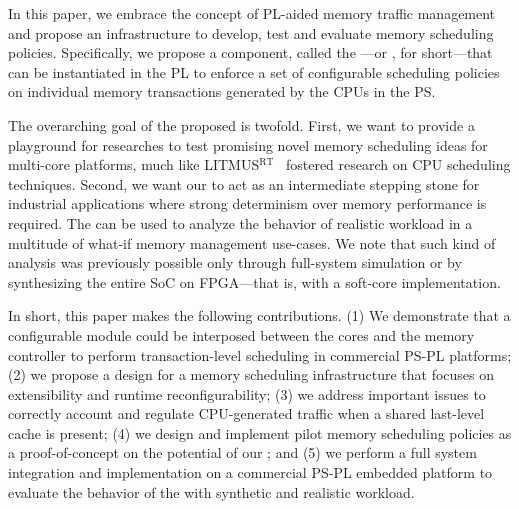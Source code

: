 In this paper, we embrace the concept of PL-aided memory traffic
management and propose an infrastructure to develop, test and evaluate
memory scheduling policies. Specifically, we propose a component,
called the \schimL---or \schim, for short---that can be instantiated
in the PL to enforce a set of configurable scheduling policies on
individual memory transactions generated by the CPUs in the PS.

The overarching goal of the proposed \schim is twofold. First, we want
to provide a playground for researches to test promising novel memory
scheduling ideas for multi-core platforms, much like
LITMUS$^{\text{RT}}$~\cite{litmus-rt} fostered research on CPU
scheduling techniques. Second, we want our \schim to act as an
intermediate stepping stone for industrial applications where strong
determinism over memory performance is required. The \schim can be
used to analyze the behavior of realistic workload in a multitude of
what-if memory management use-cases. We note that such kind of
analysis was previously possible only through full-system simulation
or by synthesizing the entire SoC on FPGA---that is, with a soft-core
implementation.

In short, this paper makes the following contributions. (1) We
demonstrate that a configurable module could be interposed between the
cores and the memory controller to perform transaction-level
scheduling in commercial PS-PL platforms; (2) we propose a design for
a memory scheduling infrastructure that focuses on extensibility and
runtime reconfigurability; (3) we address important issues to
correctly account and regulate CPU-generated traffic when a shared
last-level cache is present; (4) we design and implement  pilot
memory scheduling policies as a proof-of-concept on the potential of
our \schim; and (5) we perform a full system integration and
implementation on a commercial PS-PL embedded platform to evaluate the behavior of the \schim with synthetic and realistic workload.





